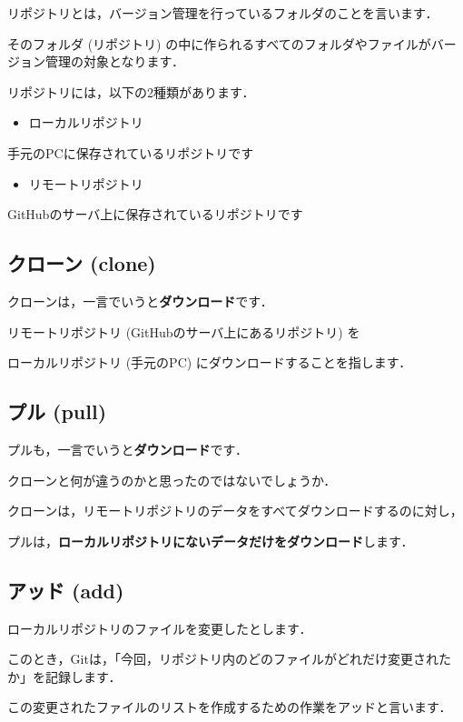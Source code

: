 リポジトリとは，バージョン管理を行っているフォルダのことを言います．

そのフォルダ (リポジトリ) の中に作られるすべてのフォルダやファイルがバージョン管理の対象となります．

リポジトリには，以下の2種類があります．

\begin{itemize}
\item ローカルリポジトリ
\end{itemize}


    手元のPCに保存されているリポジトリです


\begin{itemize}
\item リモートリポジトリ
\end{itemize}


    GitHubのサーバ上に保存されているリポジトリです


\subsection{クローン (clone)}

クローンは，一言でいうと\textbf{ダウンロード}です．

リモートリポジトリ (GitHubのサーバ上にあるリポジトリ) を

ローカルリポジトリ (手元のPC) にダウンロードすることを指します．


\subsection{プル (pull)}

プルも，一言でいうと\textbf{ダウンロード}です．

クローンと何が違うのかと思ったのではないでしょうか．

クローンは，リモートリポジトリのデータをすべてダウンロードするのに対し，

プルは，\textbf{ローカルリポジトリにないデータだけをダウンロード}します．


\subsection{アッド (add)}

ローカルリポジトリのファイルを変更したとします．

このとき，Gitは，「今回，リポジトリ内のどのファイルがどれだけ変更されたか」を記録します．

この変更されたファイルのリストを作成するための作業をアッドと言います．


